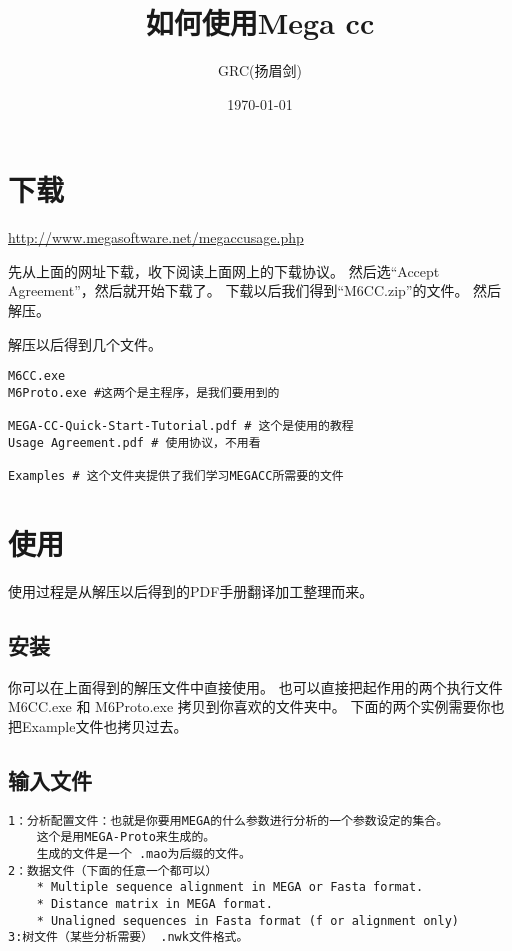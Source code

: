 \documentclass[11pt]{ctexart}
\title{如何使用Mega cc}
\author{GRC(扬眉剑)}
\date{\today}
\begin{document}
\maketitle

\setcounter{tocdepth}{3}
\tableofcontents
\vspace*{1cm}

\section{下载}
\label{sec-1}

\href{http://www.megasoftware.net/megaccusage.php}{http://www.megasoftware.net/megaccusage.php}

先从上面的网址下载，收下阅读上面网上的下载协议。
然后选“Accept Agreement”，然后就开始下载了。
下载以后我们得到“M6CC.zip”的文件。
然后解压。

解压以后得到几个文件。

\begin{verbatim}
M6CC.exe
M6Proto.exe #这两个是主程序，是我们要用到的

MEGA-CC-Quick-Start-Tutorial.pdf # 这个是使用的教程
Usage Agreement.pdf # 使用协议，不用看

Examples # 这个文件夹提供了我们学习MEGACC所需要的文件
\end{verbatim}
\section{使用}
\label{sec-2}

使用过程是从解压以后得到的PDF手册翻译加工整理而来。
\subsection{安装}
\label{sec-2-1}

你可以在上面得到的解压文件中直接使用。
也可以直接把起作用的两个执行文件M6CC.exe 和 M6Proto.exe
拷贝到你喜欢的文件夹中。
下面的两个实例需要你也把Example文件也拷贝过去。
\subsection{输入文件}
\label{sec-2-2}


\begin{verbatim}
1：分析配置文件：也就是你要用MEGA的什么参数进行分析的一个参数设定的集合。
    这个是用MEGA-Proto来生成的。
    生成的文件是一个 .mao为后缀的文件。
2：数据文件（下面的任意一个都可以）
    * Multiple sequence alignment in MEGA or Fasta format. 
    * Distance matrix in MEGA format. 
    * Unaligned sequences in Fasta format (f or alignment only)
3:树文件（某些分析需要） .nwk文件格式。
\end{verbatim}
\end{document}

